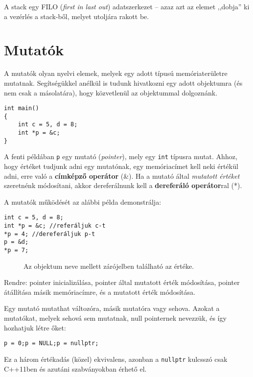 \documentclass[../cpp_book/cpp_book.tex]{subfiles}
\begin{document}
	A stack egy FILO (\textit{first in last out}) adatszerkezet -- azaz azt az elemet ,,dobja'' ki a vezérlés a stack-ből, melyet utoljára rakott be.
	\section{Mutatók}
	A mutatók olyan nyelvi elemek, melyek egy adott típusú memóriaterületre mutatnak. Segítségükkel anélkül is tudunk hivatkozni egy adott objektumra (és nem csak a másolatára), hogy közvetlenül az objektummal dolgoznánk.
	\begin{lstlisting}
int main()
{
	int c = 5, d = 8;
	int *p = &c;
}
	\end{lstlisting}
	A fenti példában \texttt{p} egy mutató (\textit{pointer}), mely egy \texttt{int} típusra mutat. Ahhoz, hogy értéket tudjunk adni egy mutatónak, egy memóriacímet kell neki értékül adni, erre való a \textbf{címképző operátor} (\&). Ha a mutató által \textit{mutatott értéket} szeretnénk módosítani, akkor dereferálnunk kell a \textbf{dereferáló operátor}ral (*).
	
	A mutatók működését az alábbi példa demonstrálja:
	\begin{lstlisting}
int c = 5, d = 8;
int *p = &c; //referáljuk c-t
*p = 4; //dereferáljuk p-t
p = &d;
*p = 7;
	\end{lstlisting}
	\begin{figure}[!h]
		\centering
		
		
		\smallskip
		\caption{Az objektum neve mellett zárójelben található az értéke.}\label{fig_stack_pointer_intro}
	\end{figure}
	Rendre: pointer inicializálása, pointer által mutatott érték módosítása, pointer átállítása másik memóriacímre, és a mutatott érték módosítása.
	
	Egy mutató mutathat változóra, másik mutatóra vagy sehova. Azokat a mutatókat, melyek sehová sem mutatnak, null pointernek nevezzük, és így hozhatjuk létre őket:
	
	{\centering \texttt{p = 0;\quad \quad p = NULL;\quad \quad p = nullptr;} \par}
	\begin{note}
		Ez a három értékadás (közel) ekvivalens, azonban a \texttt{nullptr} kulcsszó csak C++11ben és azutáni szabványokban érhető el.
	\end{note}
\end{document}
